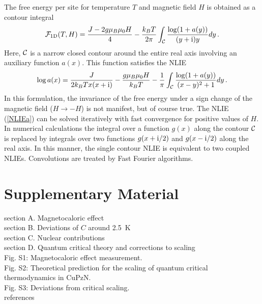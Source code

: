 \documentclass[12pt]{article}
\begin{document}
The free energy per site for temperature $T$ and magnetic field $H$ is obtained as a contour integral
\begin{equation}
\mathcal{F}_{\rm 1D}(T,H)=\frac{J-2g \mu_B \mu_0 H}{4}
-\frac {k_BT}{2\pi}\int_{{\cal C}} \frac{\log(1+a(y))}{(y+{\rm i})y}dy\, .    \label{eigenvalue}
\end{equation}
Here, ${\cal C}$ is a narrow closed contour around the entire real axis involving an auxiliary function $a(x)$. This function satisfies the NLIE
\begin{equation}
\log a(x)= \frac{J}{2k_BTx(x+{\rm i})}-\frac{g \mu_B \mu_0 H}{k_BT} -\frac 1{\pi}\int_{{\cal C}} 
\frac{\log(1+a(y))}{(x-y)^2+1}dy\,. \label{NLIEa}
\end{equation}
In this formulation, the invariance of the free energy under a sign change of the magnetic field ($H\to-H$) is not manifest, but of course true. The NLIE (\ref{NLIEa}) can be solved iteratively with fast convergence for positive values of $H$. In numerical calculations the integral over a function $g(x)$ along the contour ${\cal C}$ is replaced by integrals over two functions $g(x+{\rm i}/2)$ and $g(x-{\rm i}/2)$ along the real axis. In this manner, the single contour NLIE is equivalent to two coupled NLIEs. Convolutions are treated by Fast Fourier algorithms.


\section*{Supplementary Material}
section A. Magnetocaloric effect \\
section B. Deviations of $C$ around 2.5~K \\
section C. Nuclear contributions \\
section D. Quantum critical theory and corrections to scaling \\
Fig. S1: Magnetocaloric effect measurement. \\
Fig. S2: Theoretical prediction for the scaling of quantum critical thermodynamics in CuPzN. \\
Fig. S3: Deviations from critical scaling. \\
references \cite{Rost2009,Tokiwa2011,Wolf2011,Dubiel2009}




%
%
\end{document}
